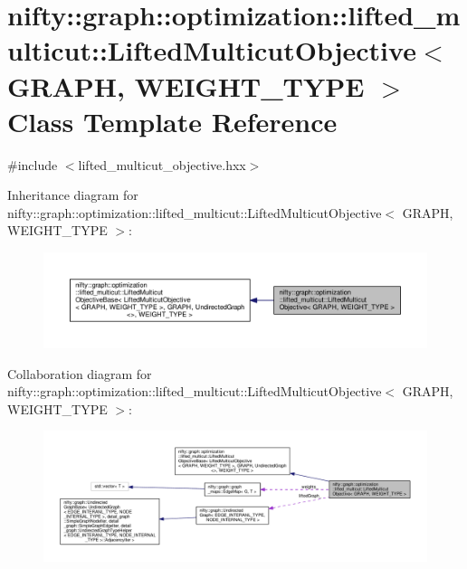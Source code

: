 \hypertarget{classnifty_1_1graph_1_1optimization_1_1lifted__multicut_1_1LiftedMulticutObjective}{}\section{nifty\+:\+:graph\+:\+:optimization\+:\+:lifted\+\_\+multicut\+:\+:Lifted\+Multicut\+Objective$<$ G\+R\+A\+P\+H, W\+E\+I\+G\+H\+T\+\_\+\+T\+Y\+P\+E $>$ Class Template Reference}
\label{classnifty_1_1graph_1_1optimization_1_1lifted__multicut_1_1LiftedMulticutObjective}


{\ttfamily \#include $<$lifted\+\_\+multicut\+\_\+objective.\+hxx$>$}



Inheritance diagram for nifty\+:\+:graph\+:\+:optimization\+:\+:lifted\+\_\+multicut\+:\+:Lifted\+Multicut\+Objective$<$ G\+R\+A\+P\+H, W\+E\+I\+G\+H\+T\+\_\+\+T\+Y\+P\+E $>$\+:\nopagebreak
\begin{figure}[H]
\begin{center}
\leavevmode
\includegraphics[width=350pt]{classnifty_1_1graph_1_1optimization_1_1lifted__multicut_1_1LiftedMulticutObjective__inherit__graph}
\end{center}
\end{figure}


Collaboration diagram for nifty\+:\+:graph\+:\+:optimization\+:\+:lifted\+\_\+multicut\+:\+:Lifted\+Multicut\+Objective$<$ G\+R\+A\+P\+H, W\+E\+I\+G\+H\+T\+\_\+\+T\+Y\+P\+E $>$\+:\nopagebreak
\begin{figure}[H]
\begin{center}
\leavevmode
\includegraphics[width=350pt]{classnifty_1_1graph_1_1optimization_1_1lifted__multicut_1_1LiftedMulticutObjective__coll__graph}
\end{center}
\end{figure}
